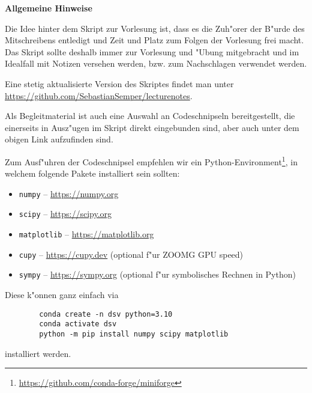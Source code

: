 \glsunsetall
%
\maketitle
\tableofcontents
\clearpage
%
\listoffigures
{}
\listoflistings
{}
\listoflinks
{}
\clearpage
%
\pretocmd{\section}{\FloatBarrier\clearpage}{}{}
\pretocmd{\subsection}{\FloatBarrier}{}{}
%
%
\begin{center}
    \begin{minipage}{0.75\textwidth}
        \begin{center}
            \textbf{\large Allgemeine Hinweise}
        \end{center}
        Die Idee hinter dem Skript zur Vorlesung ist, dass es die Zuh"orer der B"urde des Mitschreibens entledigt und Zeit und Platz zum Folgen der Vorlesung frei macht.
        Das Skript sollte deshalb immer zur Vorlesung und "Ubung mitgebracht und im Idealfall mit Notizen versehen werden, bzw. zum Nachschlagen verwendet werden.

        Eine stetig aktualisierte Version des Skriptes findet man unter \url{https://github.com/SebastianSemper/lecturenotes}.

        Als Begleitmaterial ist auch eine Auswahl an Codeschnipseln bereitgestellt, die einerseits in Ausz"ugen im Skript direkt eingebunden sind, aber auch unter dem obigen Link aufzufinden sind.

        Zum Ausf"uhren der Codeschnipsel empfehlen wir ein Python-Environment\footnote{\url{https://github.com/conda-forge/miniforge}}, in welchem folgende Pakete installiert sein sollten:
        \begin{itemize}
            \item \texttt{numpy} -- \url{https://numpy.org}
            \item \texttt{scipy} -- \url{https://scipy.org}
            \item \texttt{matplotlib} -- \url{https://matplotlib.org}
            \item \texttt{cupy} -- \url{https://cupy.dev} (optional f"ur ZOOMG GPU speed)
            \item \texttt{sympy} -- \url{https://sympy.org} (optional f"ur symbolisches Rechnen in Python)
        \end{itemize}
        Diese k"onnen ganz einfach via
        \begin{verbatim}
        conda create -n dsv python=3.10
        conda activate dsv
        python -m pip install numpy scipy matplotlib
        \end{verbatim}
        installiert werden.


\end{minipage}
\end{center}
